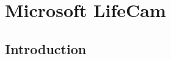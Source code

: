 %
%
%
%
%
%
%
%
%
%
%
%
%
%
%
%
%
%
%
%
%


\chapter{Microsoft LifeCam}
\label{chap:lifecam}


\section{Introduction}

